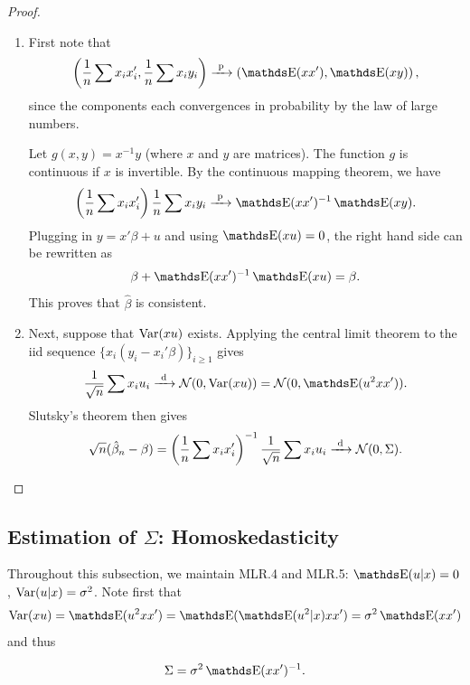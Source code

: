 \documentclass[letterpaper, 10pt]{article}
\begin{document}
\begin{proof}~
\begin{enumerate}[label=(\roman*)]
  \item First note that
    \[
      \left( \frac{1}{n} \sum x_i x_i', \frac{1}{n} \sum x_i y_i \right)
      \longprobto \left( \E(xx'), \E(xy) \right),
    \]
    since the components each convergences in probability by the law of large numbers.
    
    Let \(g(x, y) = x^{-1} y\) (where \(x\) and \(y\) are matrices).
    The function \(g\) is continuous if \(x\) is invertible.
    By the continuous mapping theorem, we have
    \[
      \left( \frac{1}{n} \sum x_i x_i' \right) \frac{1}{n} \sum x_i y_i
      \longprobto \E(xx')^{-1} \E(xy).
    \]
    Plugging in \(y = x' \beta + u\) and using \(\E(xu) = 0\), the right hand side can be rewritten as
    \[
      \beta + \E(xx')^{-1} \E(xu) = \beta.
    \]
    This proves that \(\hat{\beta}\) is consistent.

  \item Next, suppose that \(\operatorname{Var}(xu)\) exists.
    Applying the central limit theorem to the iid sequence \(\{x_i (y_i - x_i' \beta)\}_{i \geq 1}\) gives
    \[
      \frac{1}{\sqrt{n}} \sum x_i u_i \longdistto \Normal(0, \Var(xu)) = \Normal(0, \E(u^2 x x')).
    \]
    Slutsky's theorem then gives
    \[
      \sqrt{n} (\hat{\beta}_n - \beta)
      = \left( \frac{1}{n} \sum x_i x_i' \right)^{-1} \frac{1}{\sqrt{n}} \sum x_i u_i \xrightarrow{\ \mathrm{d}\ } \mathcal{N}(0, \Sigma).
    \]
\end{enumerate}
\end{proof}

\subsection{Estimation of \texorpdfstring{\(\Sigma\)}{the Asymptotic Covariance Matrix}: Homoskedasticity}
Throughout this subsection, we maintain MLR.4 and MLR.5: \(\E(u|x) = 0\), \(\operatorname{Var}(u|x) = \sigma^2\).
Note first that
\[
  \Var(xu)
  = \E(u^2 x x')
  = \E(\E(u^2|x) x x')
  = \sigma^2 \E(x x')
\]
and thus
\begin{proposition}
  \[
    \Sigma = \sigma^2 \E(x x')^{-1}.
  \]
\end{proposition}
\end{document}
